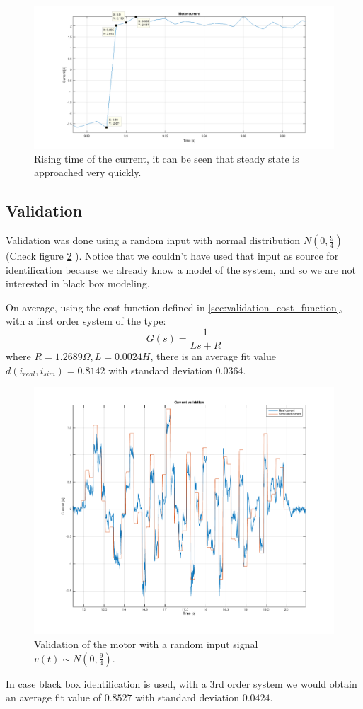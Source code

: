 \begin{figure}[!h]
    \centering
    \includegraphics[width=1\textwidth]{img/motor_id_2.png}
    \caption{Rising time of the current, it can be seen that steady state is approached very quickly.}
    \label{fig:motor_id_2}
\end{figure}
\subsection{Validation}
\label{sec:validation}
Validation was done using a random input with normal distribution $N(0,\frac{9}{4})$ (Check figure \ref{fig:motor_validation} ). Notice that we couldn't have used that input as source for identification because we already know a model of the system, and so we are not interested in black box modeling. 

On average, using the cost function defined in \ref{sec:validation_cost_function}, with a first order system of the type:
$$G(s) = \frac{1}{Ls+R}$$
where $R=1.2689 \Omega, L=0.0024 H$, there is an average fit value $d(i_{real},i_{sim})=0.8142$ with standard deviation $0.0364$.
\begin{figure}[!h]
    \centering
    \includegraphics[width=1\textwidth]{img/motor_validation.png}
    \caption{Validation of the motor with a random input signal $v(t) \sim N(0,\frac{9}{4})$.}
    \label{fig:motor_validation}
\end{figure}
In case black box identification is used, with a $3$rd order system we would obtain an average fit value of $0.8527$ with standard deviation $0.0424$. \\ \\
\newpage
